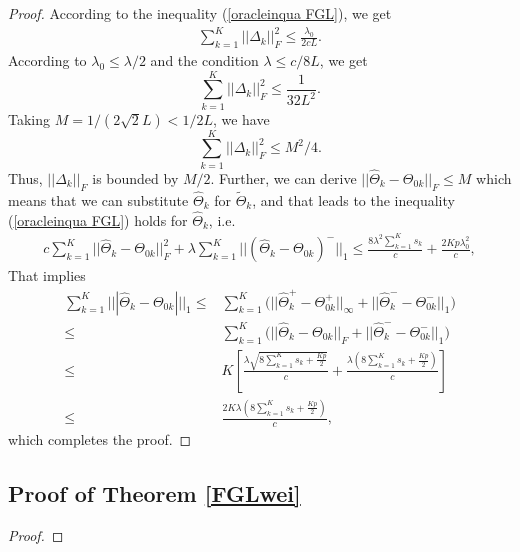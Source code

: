 \documentclass[review]{elsarticle}
\newcommand{\1}{{\bf 1}}
\newcommand{\0}{{\bf 0}}
\newcommand{\bqa}{\begin{eqnarray}}
\newcommand{\eqa}{\end{eqnarray}}
\newtheorem{proof}{Proof}
\begin{document}
\begin{appendices}
\begin{proof}
 According to the inequality (\ref{oracleinqua FGL}), we get
\bqa
\sum_{k=1}^{K}||\Delta_{k}||_{F}^{2}
\leq \frac{\lambda_0}{2cL}.
\eqa
 According to $\lambda_0\leq \lambda/2$ and the condition $\lambda\leq c/8L$, we get
\begin{equation}
\sum_{k=1}^{K}||\Delta_{k}||_{F}^{2}
\leq\frac{1}{32L^2}.
\end{equation}
 Taking $M=1/(2\sqrt{2}L)<1/2L$, we have
\begin{equation}
\sum_{k=1}^{K}||\Delta_{k}||_{F}^{2}
\leq M^2/4.
\end{equation}
Thus, $||\Delta_{k}||_{F}$ is bounded by $M/2$.
Further, we can derive $||\widehat{\Theta}_k-\Theta_{0k}||_F\leq M$ which means that we can substitute $\widehat{\Theta}_k$ for $\widetilde{\Theta}_k$, and that leads to the inequality (\ref{oracleinqua FGL}) holds for $\widehat{\Theta}_k$, i.e.
\begin{equation}
\begin{split}
c\sum_{k=1}^{K}||\widehat{\Theta}_k-\Theta_{0k}||_{F}^2
+\lambda\sum_{k=1}^{K}||(\widehat{\Theta}_k-\Theta_{0k})^{-}||_1
\leq \frac{8\lambda^2\sum_{k=1}^{K}s_k}{c}+\frac{2Kp\lambda_0^2}{c},
\end{split}
\end{equation}
That implies
\begin{equation}\label{End}
\begin{split}
\sum_{k=1}^K|||\widehat{\Theta}_k-\Theta_{0k}|||_1
\leq &
\sum_{k=1}^K\Big(||\widehat{\Theta}_k^{+}-\Theta_{0k}^{+}||_{\infty}
+||\widehat{\Theta}_k^{-}-\Theta_{0k}^{-}||_{1}\Big)\\
\leq &\sum_{k=1}^K\Big(||\widehat{\Theta}_k-\Theta_{0k}||_{F}
+||\widehat{\Theta}_k^{-}-\Theta_{0k}^{-}||_{1}\Big)\\
\leq &K\left[\frac{\lambda\sqrt{8\sum_{k=1}^{K}s_k+\frac{Kp}{2}}}{c}
+\frac{\lambda\left(8\sum_{k=1}^{K}s_k+\frac{Kp}{2}\right)}{c}\right]\\
\leq &\frac{2K\lambda\left(8\sum_{k=1}^{K}s_k+\frac{Kp}{2}\right)}{c},
\end{split}
\end{equation}
 which completes the proof.

\end{proof}

\subsection{Proof of Theorem \ref{FGLwei}}

\begin{proof}


\end{proof}
\end{appendices}
\end{document}
